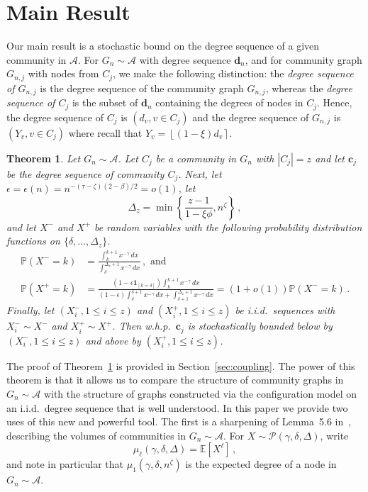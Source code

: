 \documentclass[12pt]{article}
\newtheorem{theorem}{Theorem}
\theoremstyle{definition}
\theoremstyle{remark}
\theoremstyle{remark}
\numberwithin{theorem}{section}
\newcommand{\E}[1]{{\mathbb E}\left[#1\right]}
\newcommand{\p}[1]{\mathbb{P}\left(#1\right)}
\newcommand{\I}[1]{{\mathbf 1}_{[#1]}}
\newcommand{\abcdDist}{\ensuremath{\mathcal{A}}}
\newcommand{\round}[1]{\ensuremath{\left\lfloor #1 \right\rceil}}
\newcommand{\tpl}[3]{\ensuremath{\mathcal{P}\left(#1,#2,#3\right)}}
\newcommand{\moment}[2]{\ensuremath{\mu_{#1}(#2)}}
\begin{document}
\section{Main Result}\label{sec:main_result}

Our main result is a stochastic bound on the degree sequence of a given community in $\abcdDist$. For $G_n \sim \abcdDist$ with degree sequence $\textbf{d}_n$, and for community graph $G_{n,j}$ with nodes from $C_j$, we make the following distinction: the \textit{degree sequence of $G_{n,j}$} is the degree sequence of the community graph $G_{n,j}$, whereas the \textit{degree sequence of $C_{j}$} is the subset of $\textbf{d}_n$ containing the degrees of nodes in $C_j$. Hence, the degree sequence of $C_j$ is $(d_v, v \in C_j)$ and the degree sequence of $G_{n,j}$ is $(Y_v, v \in C_j)$ where recall that $Y_v = \round{(1-\xi)d_v}$. 

\begin{theorem}\label{thm:main}
Let $G_n \sim \abcdDist$. Let $C_j$ be a community in $G_n$ with $|C_j| = z$ and let $\textbf{c}_j$ be the degree sequence of community $C_j$. Next, let $\epsilon = \epsilon(n) = n^{-(\tau-\zeta)(2-\beta)/2} = o(1)$, let 
\[
\Delta_z = \min\left\{ \frac{z-1}{1-\xi \phi}, n^\zeta \right\} \,,
\] 
and let $X^-$ and $X^+$ be random variables with the following probability distribution functions on $\{\delta,\dots,\Delta_z\}$. 
\begin{align*}
\p{X^- = k} 
&=
\frac{\int_k^{k+1} x^{-\gamma} \, dx}{\int_\delta^{\Delta_z+1} x^{-\gamma} \, dx} \,, \text{ and } \\
\p{X^+ = k} 
&=
\frac{\left( 1 - \epsilon \I{k = \delta} \right)\int_k^{k+1} x^{-\gamma} \, dx}{(1-\epsilon)\int_{\delta}^{\delta+1} x^{-\gamma} \, dx + \int_{\delta+1}^{\Delta_z+1} x^{-\gamma} \, dx} = (1+o(1)) \p{X^- = k} \,. 
\end{align*}
Finally, let $(X_i^-, 1\leq i \leq z)$ and $(X_i^+,1\leq i \leq z)$ be i.i.d.\ sequences with $X_i^- \sim X^-$ and $X_i^+ \sim X^+$. Then w.h.p.\ $\textbf{c}_j$ is stochastically bounded below by $(X_i^-, 1\leq i \leq z)$ and above by $(X_i^+,1\leq i \leq z)$.
\end{theorem}

The proof of Theorem~\ref{thm:main} is provided in Section~\ref{sec:coupling}. The power of this theorem is that it allows us to compare the structure of community graphs in $G_n \sim \abcdDist$ with the structure of graphs constructed via the configuration model on an i.i.d.\ degree sequence that is well understood. In this paper we provide two uses of this new and powerful tool. The first is a sharpening of Lemma~5.6 in~\cite{kaminski2022modularity}, describing the volumes of communities in $G_n \sim \abcdDist$. For $X \sim \tpl{\gamma}{\delta}{\Delta}$, write  
\begin{equation}\label{eq:first moment}
\moment{\ell}{\gamma,\delta,\Delta} = \E{X^\ell} \,,
\end{equation}
and note in particular that $\moment{1}{\gamma,\delta,n^\zeta}$ is the expected degree of a node in $G_n \sim \abcdDist$. 
\end{document}
